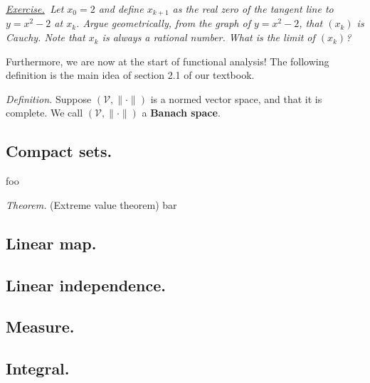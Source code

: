 \documentclass[12pt]{article}
\newcommand{\cV}{\mathcal{V}}
\newcommand{\sect}[1]{\subsection*{#1.}}
\newcommand{\defin}{\emph{Definition.}\,\,}
\newcommand{\thm}{\emph{Theorem.}\,\,}
\newcommand{\exer}[2]{\emph{\underline{Exercise.}\, #2} \vspace*{#1mm}}
\begin{document}
\exer{50}{Let $x_0=2$ and define $x_{k+1}$ as the real zero of the tangent line to $y=x^2-2$ at $x_k$.  Argue geometrically, from the graph of $y=x^2-2$, that $(x_k)$ is Cauchy.  Note that $x_k$ is always a rational number.  What is the limit of $(x_k)$?}


Furthermore, we are now at the start of functional analysis!  The following definition is the main idea of section 2.1 of our textbook.

\defin Suppose $(\cV,\|\cdot\|)$ is a normed vector space, and that it is complete.  We call $(\cV,\|\cdot\|)$ a \textbf{Banach space}.



\sect{Compact sets}

foo

\thm (Extreme value theorem) bar



\sect{Linear map}

\sect{Linear independence}

\sect{Measure}

\sect{Integral}
\end{document}
